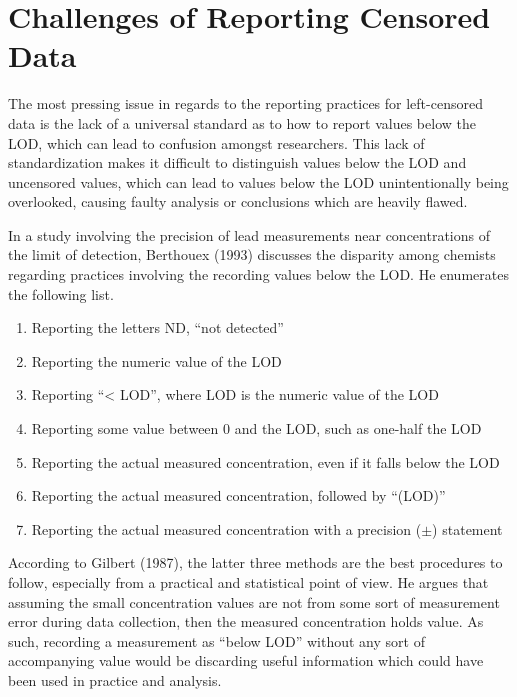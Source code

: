 \documentclass[12pt, twoside]{amherstthesis}
\begin{document}
\hypertarget{challenges}{%
\section{Challenges of Reporting Censored Data}\label{challenges}}

The most pressing issue in regards to the reporting practices for left-censored data is the lack of a universal standard as to how to report values below the LOD, which can lead to confusion amongst researchers. This lack of standardization makes it difficult to distinguish values below the LOD and uncensored values, which can lead to values below the LOD unintentionally being overlooked, causing faulty analysis or conclusions which are heavily flawed.

In a study involving the precision of lead measurements near concentrations of the limit of detection, Berthouex (1993) discusses the disparity among chemists regarding practices involving the recording values below the LOD. He enumerates the following list.
\begin{enumerate}
  \item Reporting the letters ND, ``not detected''
  \item Reporting the numeric value of the LOD
  \item Reporting ``< LOD'', where LOD is the numeric value of the LOD 
  \item Reporting some value between 0 and the LOD, such as one-half the LOD
  \item Reporting the actual measured concentration, even if it falls below the LOD
  \item Reporting the actual measured concentration, followed by ``(LOD)''
  \item Reporting the actual measured concentration with a precision ($\pm$) statement
\end{enumerate}
According to Gilbert (1987), the latter three methods are the best procedures to follow, especially from a practical and statistical point of view. He argues that assuming the small concentration values are not from some sort of measurement error during data collection, then the measured concentration holds value. As such, recording a measurement as ``below LOD'' without any sort of accompanying value would be discarding useful information which could have been used in practice and analysis.
\end{document}
